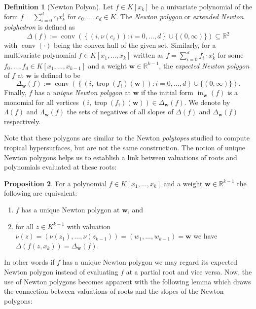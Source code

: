 \documentclass[
  paper=a4,
  titlepage,
  bibliography=totoc,
  listof=totoc,
  pagesize=pdftex
]{scrartcl}
\numberwithin{figure}{section}
\numberwithin{equation}{section}
\numberwithin{table}{section}
\newcommand*\setR{\mathds{R}}
\let\vec\mathbf
\DeclareMathOperator{\trop}{trop}
\DeclareMathOperator{\initial}{in}
\DeclareMathOperator{\conv}{conv}
\theoremstyle{definition}
\newtheorem{definition}{Definition}
\newtheorem{proposition}[definition]{Proposition}
\numberwithin{definition}{section}
\begin{document}
\begin{definition}[Newton Polyon]
  Let $f \in K[x_k]$ be a univariate polynomial of the form $f = \sum_{i=0}^d c_i x_k^i$
  for $c_0, \dots, c_d \in K$. The \emph{Newton polygon} or \emph{extended Newton
  polyhedron} is defined as
  \[
    \Delta(f) := \conv \left(
      \left\{ (i, \nu(c_i)) : i = 0, \dots, d \right\}
      \cup \{ (0, \infty) \}
    \right)
    \subseteq \setR^2
  \]
  with $\conv(\cdot)$ being the convex hull of the given set. Similarly, for a
  multivariate polynomial $f \in K[x_1, \dots, x_k]$ written as $f = \sum_{i=0}^d f_i
  \cdot x_k^i$ for some $f_0, \dots, f_d \in K[x_1, \dots, x_{k-1}]$ and a weight $\vec w
  \in \setR^{k-1}$, the \emph{expected Newton polygon} of $f$ at $\vec w$ is defined to be
  \[
    \Delta_{\vec w}(f) := \conv\left(
      \left\{ (i, \trop(f_i)(\vec w)) : i = 0, \dots, d \right\}
      \cup \{ (0, \infty) \}
    \right).
  \]
  Finally, $f$ has a \emph{unique Newton polygon} at $\vec w$ if the initial form
  $\initial_{\vec w}(f)$ is a monomial for all vertices $(i, \trop(f_i)(\vec w)) \in
  \Delta_{\vec w}(f)$. We denote by $\Lambda(f)$ and $\Lambda_{\vec w}(f)$ the sets of
  negatives of all slopes of $\Delta(f)$ and $\Delta_{\vec w}(f)$ respectively.
  \label{def:newtonPoly}
\end{definition}

Note that these polygons are similar to the Newton \emph{polytopes} studied to compute
tropical hypersurfaces, but are not the same construction. The notion of unique Newton
polygons helps us to establish a link between valuations of roots and polynomials
evaluated at these roots:

\begin{proposition}
  \label{prp:expectedNewt}
  For a polynomial $f \in K[x_1, \dots, x_k]$ and a weight $\vec w \in \setR^{k-1}$ the
  following are equivalent:
  \begin{enumerate}
    \item $f$ has a unique Newton polygon at $\vec w$, and
    \item for all $z \in K^{k-1}$ with valuation $\nu(z) = (\nu(z_1), \dots, \nu(z_{k-1}))
      = (w_1, \dots, w_{k-1}) = \vec w$ we have $\Delta(f(z, x_k)) = \Delta_{\vec w}(f)$.
  \end{enumerate}
\end{proposition}

In other words if $f$ has a unique Newton polygon we may regard its expected Newton
polygon instead of evaluating $f$ at a partial root and vice versa. Now, the use of Newton
polygons becomes apparent with the following lemma which draws the connection between
valuations of roots and the slopes of the Newton polygons:
\end{document}
